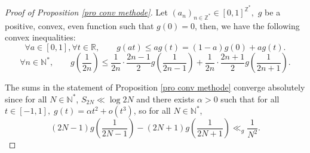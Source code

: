 \documentclass[12pt]{amsart}
\theoremstyle{definition}
\numberwithin{equation}{section}
\numberwithin{equation}{section}
\def\N{\mathbb{N}}
\def\R{\mathbb{R}}
\def\Z{\mathbb{Z}}
\begin{document}
\begin{proof}[Proof of Proposition \ref{pro conv methode}] Let $(a_n)_{n\in\Z^*}\!\in[0,1]^{\Z^*}\!\!,$ $g$ be a positive, convex, even function such that $g(0) = 0$, then, we have the following convex inequalities: 
\begin{equation}\label{ineq conv 1}
    \forall a\in [0,1], \forall t\in\R,\qquad g(a t)\leq a g(t) = (1-a)g(0)+ag(t).
\end{equation}
\begin{equation}\label{ineq conv 2}
    \forall n\in \N^*,\qquad g\left(\frac{1}{2n} \right) 
\leq 
\frac{1}{2n}\cdot \frac{2n-1}{2}g\left(\frac{1}{2n-1}\right)+
\frac{1}{2n}\cdot \frac{2n+1}{2}g\left(\frac{1}{2n+1}\right).
\end{equation}

The sums in the statement of Proposition \ref{pro conv methode} converge absolutely since for all $N\in \N^*$, $S_{2N}\ll \log 2N$ and 
there exists $\alpha>0$ such that for all  $t\in[-1,1],\; g\left(t\right)= \alpha t^2+ o\left(t^3\right)$, so for all $N\in \N^*$,
\begin{equation}\label{ineq telescopic sum}
(2N-1)g\left(\frac{1}{2N-1}\right)
-(2N+1)g\left(\frac{1}{2N+1}\right)
\ll_g \frac{1}{N^2}.
\end{equation}


\end{proof}
\end{document}
